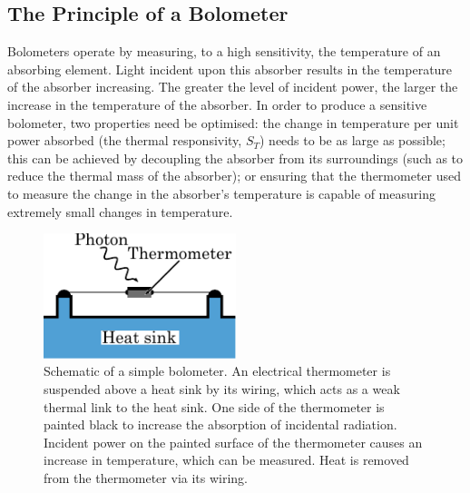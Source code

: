 \subsection{The Principle of a Bolometer} \label{ssec:principleBolometer}
Bolometers operate by measuring, to a high sensitivity, the temperature of an absorbing element. Light incident upon this absorber results in the temperature of the absorber increasing. The greater the level of incident power, the larger the increase in the temperature of the absorber. In order to produce a sensitive bolometer, two properties need be optimised: the change in temperature per unit power absorbed (the thermal responsivity, $S_{T}$) needs to be as large as possible; this can be achieved by decoupling the absorber from its surroundings (such as to reduce the thermal mass of the absorber); or ensuring that the thermometer used to measure the change in the absorber's temperature is capable of measuring extremely small changes in temperature.
\begin{figure}[t]
\begin{center}
\includegraphics[width = 0.5\textwidth]{figures/simple_bolometer}
\caption[Schematic of a simple bolometer]{Schematic of a simple bolometer. An electrical thermometer is suspended above a heat sink by its wiring, which acts as a weak thermal link to the heat sink. One side of the thermometer is painted black to increase the absorption of incidental radiation. Incident power on the painted surface of the thermometer causes an increase in temperature, which can be measured. Heat is removed from the thermometer via its wiring.}
\label{fig:simpleBolometer}
\end{center}
\end{figure}
\par 
